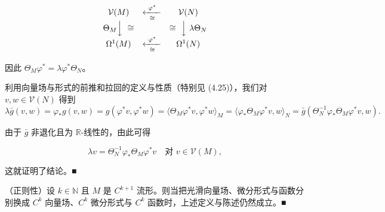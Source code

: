 \begin{remark}
\begin{items}
\begin{equation*}
\begin{array}{ccc} \mathcal{V}(M) & \xleftarrow[\ \cong\ ]{\ \varphi^{*}\ } & \mathcal{V}(N) \\ \Theta_{M}\Big\downarrow\ \cong & & \cong\ \Big\downarrow\ \lambda\Theta_{N} \\ \Omega^{1}(M) & \xleftarrow[\ \cong\ ]{\ \varphi^{*}\ } & \Omega^{1}(N) \end{array}
\end{equation*}

因此 $ \Theta_{M}\varphi^{*} = \lambda\varphi^{*}\Theta_{N} $。

\proofhead
利用向量场与形式的前推和拉回的定义与性质（特别见 (4.25)），我们对 $ v, w \in \mathcal{V}(N) $ 得到
\[
\lambda\bar{g}(v, w) = \varphi_{*}g(v, w) = g(\varphi^{*}v, \varphi^{*}w) = \langle \Theta_{M}\varphi^{*}v, \varphi^{*}w \rangle_{M} = \langle \varphi_{*}\Theta_{M}\varphi^{*}v, w \rangle_{N} = \bar{g}(\Theta_{N}^{-1}\varphi_{*}\Theta_{M}\varphi^{*}v, w).
\]

由于 $ \bar{g} $ 非退化且为 $ \mathbb{R} $-线性的，由此可得

\[
\lambda v = \Theta_{N}^{-1}\varphi_{*}\Theta_{M}\varphi^{*}v \quad \text{对 } v \in \mathcal{V}(M),
\]

这就证明了结论。\nobreak\hspace{0.35em}■

\item

（正则性）设 $ k \in \mathbb{N} $ 且 $ M $ 是 $ C^{k+1} $ 流形。则当把光滑向量场、微分形式与函数分别换成 $ C^{k} $ 向量场、$ C^{k} $ 微分形式与 $ C^{k} $ 函数时，上述定义与陈述仍然成立。\nobreak\hspace{0.35em}■

\end{items}

\end{remark}

